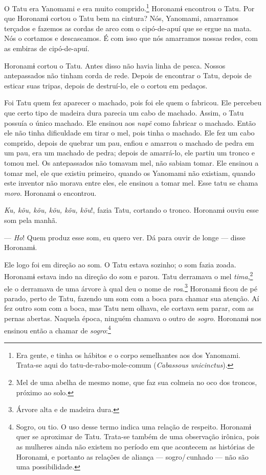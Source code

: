 
O Tatu era Yanomami e era muito comprido.\footnote{Era gente, e tinha os hábitos e o corpo semelhantes aos dos Yanomami. Trata-se aqui do tatu-de-rabo-mole-comum (\textit{Cabassous unicinctus}).}  Horonamɨ encontrou o Tatu. Por que Horonamɨ cortou o Tatu bem na cintura? Nós, Yanomami, amarramos terçados e fazemos as cordas de arco com o cipó-de-apuí que se ergue na
mata. Nós o cortamos e descascamos. É com isso que nós amarramos nossas
redes, com as embiras de cipó-de-apuí. 

Horonamɨ cortou o Tatu. Antes disso não havia linha de pesca. Nossos
antepassados não tinham corda de rede. Depois de encontrar o Tatu,
depois de esticar suas tripas, depois de destruí-lo, ele o cortou em
pedaços. 

Foi Tatu quem fez aparecer o machado, pois foi ele quem o fabricou. Ele
percebeu que certo tipo de madeira dura parecia um cabo de machado.
Assim, o Tatu possuía o único machado. Ele ensinou aos \textit{napë} como
fabricar o machado. Então ele não tinha dificuldade em tirar o mel, pois
tinha o machado. Ele fez um cabo comprido, depois de quebrar um pau,
enfiou e amarrou o machado de pedra em um pau, era um machado de pedra;
depois de amarrá-lo, ele partiu um tronco e tomou mel. Os antepassados
não tomavam mel, não sabiam tomar. Ele ensinou a tomar mel, ele que
existiu primeiro, quando os Yanomami não existiam, quando este inventor
não morava entre eles, ele ensinou a tomar mel. Esse tatu se
chama \textit{moro}. Horonamɨ o encontrou. 

\textit{Ku, kõu, kõu, kõu, kõu, kõu}!, fazia Tatu, cortando o tronco.
Horonamɨ ouviu esse som pela manhã. 

--- \textit{Ho}! Quem produz esse som, eu quero ver. Dá para ouvir de longe --- disse
Horonamɨ. 

Ele logo foi em direção ao som. O Tatu estava sozinho; o som fazia
zoada. Horonamɨ estava indo na direção do som e parou. Tatu derramava o
mel \textit{tima},\footnote{Mel de uma abelha de mesmo nome, que faz sua 
colmeia no oco dos troncos, próximo ao solo.} ele o derramava de uma árvore à qual deu o nome
de \textit{roa}.\footnote{Árvore alta e de madeira dura.} Horonamɨ ficou de pé parado, perto de Tatu, fazendo um som com a boca para chamar sua atenção. Aí fez
outro som com a boca, mas Tatu nem olhava, ele cortava sem parar, com as
pernas abertas. Naquela época, ninguém chamava o outro de \textit{sogro}.
Horonamɨ nos ensinou então a chamar de \textit{sogro}:\footnote{Sogro, ou tio. O uso desse termo indica uma relação de respeito. Horonamɨ quer se aproximar de Tatu. Trata-se também de uma observação irônica, pois as mulheres ainda não existem no período em que acontecem as histórias de Horonamɨ, e portanto as relações de aliança --- sogro/\,cunhado --- não são uma possibilidade.}

